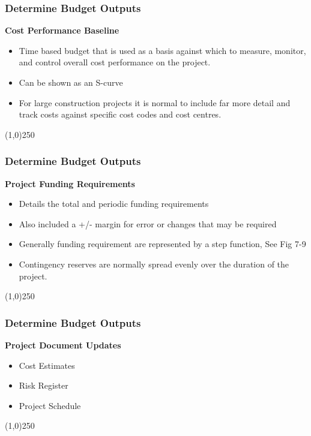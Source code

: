 \begin{frame}
\frametitle{Determine Budget \hfill\hfill Outputs}
\textbf{Cost Performance Baseline}
\begin{itemize}
	\item Time based budget that is used as a basis against which to measure, monitor, and control overall cost performance on the project.
	\item Can be shown as an S-curve
	\item For large construction projects it is normal to include far more detail and track costs against specific cost codes and cost centres.
\end{itemize}
\end{frame}
\begin{center}\line(1,0){250}\end{center}






\begin{frame}
\frametitle{Determine Budget \hfill\hfill Outputs}

\textbf{Project Funding Requirements}
\begin{itemize}
	\item Details the total and periodic funding requirements
	\item Also included a +/- margin for error or changes that may be required
	\item Generally funding requirement are represented by a step function, See Fig 7-9
	\item Contingency reserves are normally spread evenly over the duration of the project.  
\end{itemize}
\end{frame}
\begin{center}\line(1,0){250}\end{center}







\begin{frame}
\frametitle{Determine Budget \hfill\hfill Outputs}
\textbf{Project Document Updates}
\begin{itemize}
	\item Cost Estimates
	\item Risk Register
	\item Project Schedule
\end{itemize}
\end{frame}
\begin{center}\line(1,0){250}\end{center}






